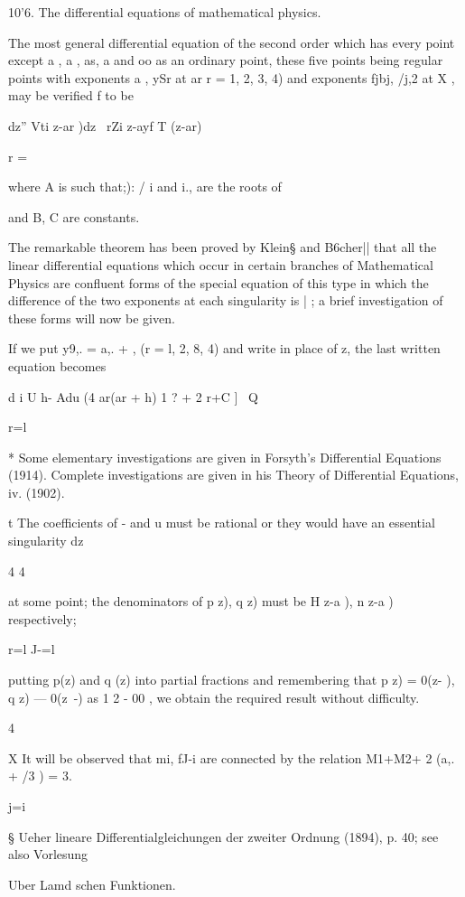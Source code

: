 10'6. The differential equations of mathematical physics. 

The most general differential equation of the second order which has 
every point except a , a , as, a  and oo as an ordinary point, these five points 
being regular points with exponents a , ySr at ar r = 1, 2, 3, 4) and exponents 
fjbj, /j,2 at X , may be verified f to be 

dz'' Vti z-ar )dz \ rZi z-ayf T (z-ar) 

r = \ 

where A is such that;): / i and  i., are the roots of 



and B, C are constants. 

The remarkable theorem has been proved by Klein§ and B6cher|| that 
all the linear differential equations which occur in certain branches of 
Mathematical Physics are confluent forms of the special equation of this 
type in which the difference of the two exponents at each singularity is | ; 
a brief investigation of these forms will now be given. 

If we put y9,. = a,. +  , (r = l, 2, 8, 4) and write   in place of z, the last 
written equation becomes 

d i U h- Adu (4 ar(ar + h) 1  ?  + 2 r+C ]  \ Q 

r=l 

* Some elementary investigations are given in Forsyth's Differential Equations (1914). 
Complete investigations are given in his Theory of Differential Equations, iv. (1902). 

t The coefficients of -  and u must be rational or they would have an essential singularity 
dz 

4 4 

at some point; the denominators of p z), q z) must be H  z-a ), n  z-a )  respectively; 

r=l J-=l 

putting p(z) and q (z) into partial fractions and remembering that p z) = 0(z- ), q z) — 0(z~-) 
as 1 2  - 00 , we obtain the required result without difficulty. 

4 

X It will be observed that mi, fJ-i are connected by the relation M1+M2+ 2 (a,. + /3 ) = 3. 

j=i 

§ Ueher lineare Differentialgleichungen der zweiter Ordnung (1894), p. 40; see also Vorlesung 

Uber Lamd schen Funktionen. 

